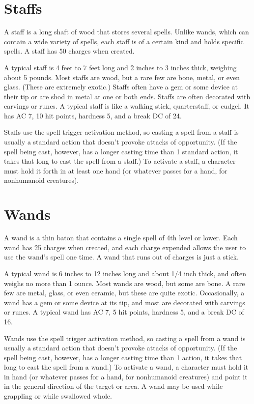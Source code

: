 \section{Staffs}

A staff is a long shaft of wood that stores several spells. Unlike wands, which can contain a wide variety of spells, each staff is of a certain kind and holds specific spells. A staff has 50 charges when created.

 A typical staff is 4 feet to 7 feet long and 2 inches to 3 inches thick, weighing about 5 pounds. Most staffs are wood, but a rare few are bone, metal, or even glass. (These are extremely exotic.) Staffs often have a gem or some device at their tip or are shod in metal at one or both ends. Staffs are often decorated with carvings or runes. A typical staff is like a walking stick, quarterstaff, or cudgel. It has AC 7, 10 hit points, hardness 5, and a break DC of 24.

 Staffs use the spell trigger activation method, so casting a spell from a staff is usually a standard action that doesn't provoke attacks of opportunity. (If the spell being cast, however, has a longer casting time than 1 standard action, it takes that long to cast the spell from a staff.) To activate a staff, a character must hold it forth in at least one hand (or whatever passes for a hand, for nonhumanoid creatures).

\section{Wands}

A wand is a thin baton that contains a single spell of 4th level or lower. Each wand has 25 charges when created, and each charge expended allows the user to use the wand's spell one time. A wand that runs out of charges is just a stick.

 A typical wand is 6 inches to 12 inches long and about 1/4 inch thick, and often weighs no more than 1 ounce. Most wands are wood, but some are bone. A rare few are metal, glass, or even ceramic, but these are quite exotic. Occasionally, a wand has a gem or some device at its tip, and most are decorated with carvings or runes. A typical wand has AC 7, 5 hit points, hardness 5, and a break DC of 16.

 Wands use the spell trigger activation method, so casting a spell from a wand is usually a standard action that doesn't provoke attacks of opportunity. (If the spell being cast, however, has a longer casting time than 1 action, it takes that long to cast the spell from a wand.) To activate a wand, a character must hold it in hand (or whatever passes for a hand, for nonhumanoid creatures) and point it in the general direction of the target or area. A wand may be used while grappling or while swallowed whole.

